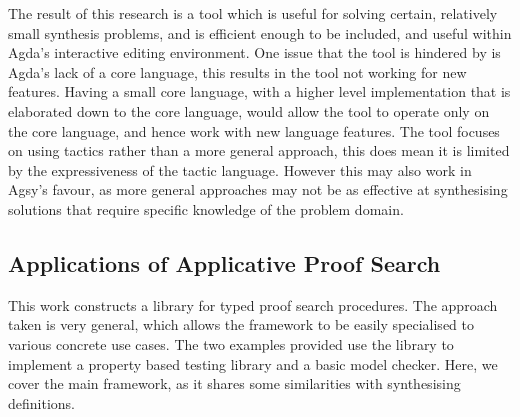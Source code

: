 \documentclass[a4paper]{article}
\begin{document}
The result of this research is a tool which is useful for solving certain, relatively small synthesis problems, and is efficient 
enough to be included, and useful within Agda's interactive editing environment. One issue that the tool is hindered by is Agda's lack of a core language,
this results in the tool not working for new features. Having a small core 
language, with a higher level implementation that is elaborated down to the core language, would allow the tool to operate only
on the core language, and hence work with new language features. The tool focuses 
on using tactics rather than a more general approach, this does mean it is limited by the expressiveness of the tactic language.
However this may also work in Agsy's favour, as more general approaches may not be as effective at synthesising solutions that 
require specific knowledge of the problem domain.

\subsection{Applications of Applicative Proof Search}
\label{sec:org5e12de7}
This work constructs a library for typed proof search procedures. The approach taken is very general, which allows the 
framework to be easily specialised to various concrete use cases. The two examples provided use the library to implement a 
property based testing library and a basic model checker. Here, we cover the main framework, as it shares some similarities 
with synthesising definitions. 
\end{document}
